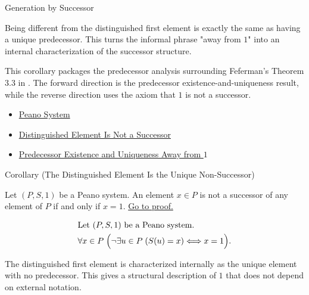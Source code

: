 \begin{topicbox}{Generation by Successor}
\begin{remark*}[Interpretation]
Being different from the distinguished first element is exactly the same as
having a unique predecessor. This turns the informal phrase "away from $1$"
into an internal characterization of the successor structure.
\end{remark*}

\begin{remark*}
This corollary packages the predecessor analysis surrounding Feferman's
Theorem 3.3 in \citet{FefermanNumberSystems1964}. The forward direction is
the predecessor existence-and-uniqueness result, while the reverse direction
uses the axiom that $1$ is not a successor.
\end{remark*}

\begin{dependencies}
\begin{itemize}
  \item \hyperref[def:peano-system]{Peano System}
  \item \hyperref[ax:peano-base-not-successor]{Distinguished Element Is Not a Successor}
  \item \hyperref[cor:predecessor-exists-unique-away-from-one]{Predecessor Existence and Uniqueness Away from $1$}
\end{itemize}
\end{dependencies}

\begin{corollarybox}{Corollary (The Distinguished Element Is the Unique Non-Successor)}
\begin{corollary}
\label{cor:one-is-unique-non-successor}
Let $(P,S,1)$ be a Peano system. An element $x \in P$ is not a successor of
any element of $P$ if and only if $x=1$.
\hyperref[prf:one-is-unique-non-successor]{Go to proof.}
\end{corollary}
\end{corollarybox}

\begin{remark*}
\[
\begin{aligned}
&\text{Let } (P,S,1) \text{ be a Peano system.}\\
&\forall x \in P\;\Bigl(\neg\exists u \in P\;(S(u)=x) \Longleftrightarrow x=1\Bigr).
\end{aligned}
\]
\end{remark*}

\begin{remark*}[Interpretation]
The distinguished first element is characterized internally as the unique
element with no predecessor. This gives a structural description of $1$ that
does not depend on external notation.
\end{remark*}


\end{topicbox}
